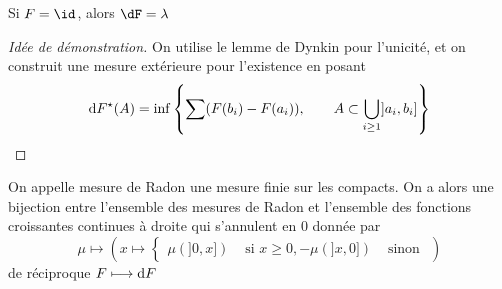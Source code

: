 \begin{ex}
Si $F=\id$, alors  $\dF=\lambda$
\end{ex}

\begin{proof}[Idée de démonstration]
On utilise le lemme de Dynkin pour l'unicité, et on construit une mesure extérieure pour l'existence en posant \[
    \mathop{}\!\mathrm d F^\star(A)=\inf \left\{ \sum (F(b_i)-F(a_i)), \qquad  A\subset \bigcup_{i\geq 1}]a_i, b_i] \right\} 
\] 
\end{proof}

\begin{defprop}
    On appelle mesure de Radon une mesure finie sur les compacts. On a alors une bijection entre l'ensemble des mesures de Radon et l'ensemble des fonctions croissantes continues à droite qui s'annulent en $0$ donnée par  \[
        \mu \longmapsto \left( x \longmapsto \begin{cases}
                \mu(]0,x]) & \text{ si } x\geq 0,
                -\mu(]x, 0])&\text{ sinon }
        \end{cases}
         \right)
    \] 
    de réciproque $F \longmapsto \mathop{}\!\mathrm d F$
\end{defprop}
